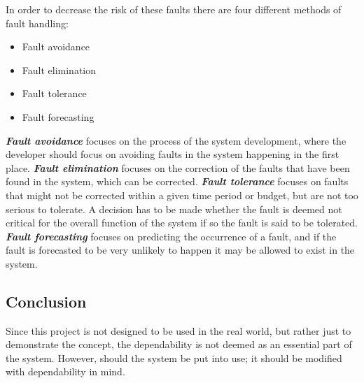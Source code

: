 In order to decrease the risk of these faults there are four different methods of fault handling:
\begin{itemize}
\item Fault avoidance
\item Fault elimination
\item Fault tolerance
\item Fault forecasting
\end{itemize}
\textit{\textbf{Fault avoidance}} focuses on the process of the system development, where the developer should focus on avoiding faults in the system happening in the first place.
\textit{\textbf{Fault elimination}} focuses on the correction of the faults that have been found in the system, which can be corrected. 
\textit{\textbf{Fault tolerance}} focuses on faults that might not be corrected within a given time period or budget, but are not too serious to tolerate.
A decision has to be made whether the fault is deemed not critical for the overall function of the system if so the fault is said to be tolerated.
\textit{\textbf{Fault forecasting}} focuses on predicting the occurrence of a fault, and if the fault is forecasted to be very unlikely to happen it may be allowed to exist in the system. 

\subsection{Conclusion}
Since this project is not designed to be used in the real world, but rather just to demonstrate the concept, the dependability is not deemed as an essential part of the system. 
However, should the system be put into use; it should be modified with dependability in mind. 
